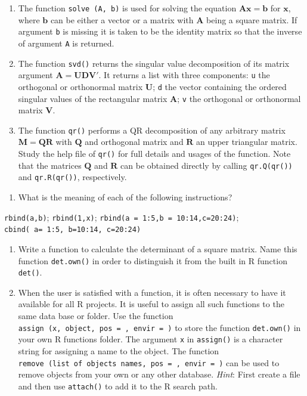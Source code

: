 \documentclass[
]{book}
\providecommand{\tightlist}{%
  \setlength{\itemsep}{0pt}\setlength{\parskip}{0pt}}
\begin{document}
\begin{enumerate}
\item
  The function \texttt{solve\ (A,\ b)} is used for solving the equation \(\mathbf{Ax=b}\) for \(\mathbf{x}\), where \(\mathbf{b}\) can be either a vector or a matrix with \(\mathbf{A}\) being a square matrix. If argument \texttt{b} is missing it is taken to be the identity matrix so that the inverse of argument \texttt{A} is returned.
\item
  The function \texttt{svd()} returns the singular value decomposition of its matrix argument \(\mathbf{A=UDV}'\). It returns a list with three components: \texttt{u} the orthogonal or orthonormal matrix \(\mathbf{U}\); \texttt{d} the vector containing the ordered singular values of the rectangular matrix \(\mathbf{A}\); \texttt{v} the orthogonal or orthonormal matrix \(\mathbf{V}\).
\item
  The function \texttt{qr()} performs a QR decomposition of any arbitrary matrix \(\mathbf{M=QR}\) with \(\mathbf{Q}\) and orthogonal matrix and \(\mathbf{R}\) an upper triangular matrix. Study the help file of \texttt{qr()} for full details and usages of the function. Note that the matrices \(\mathbf{Q}\) and \(\mathbf{R}\) can be obtained directly by calling \texttt{qr.Q(qr())} and \texttt{qr.R(qr())}, respectively.
\end{enumerate}

\begin{enumerate}
\def\labelenumi{(\alph{enumi})}
\setcounter{enumi}{11}
\tightlist
\item
  What is the meaning of each of the following instructions?
\end{enumerate}

\texttt{rbind(a,b)}; \texttt{rbind(1,x)}; \texttt{rbind(a\ =\ 1:5,b\ =\ 10:14,c=20:24)}; \texttt{cbind(\ a=\ 1:5,\ b=10:14,\ c=20:24)}

\begin{enumerate}
\def\labelenumi{(\alph{enumi})}
\setcounter{enumi}{12}
\item
  Write a function to calculate the determinant of a square matrix. Name this function \texttt{det.own()} in order to distinguish it from the built in R function \texttt{det()}.
\item
  When the user is satisfied with a function, it is often necessary to have it available for all R projects. It is useful to assign all such functions to the same data base or folder. Use the function \texttt{assign\ (x,\ object,\ pos\ =\ ,\ envir\ =\ )} to store the function \texttt{det.own()} in your own R functions folder. The argument \texttt{x} in \texttt{assign()} is a character string for assigning a name to the object. The function \texttt{remove\ (list\ of\ objects\ names,\ pos\ =\ ,\ envir\ =\ )} can be used to remove objects from your own or any other database. \emph{Hint}: First create a file and then use \texttt{attach()} to add it to the R search path.
\end{enumerate}
\end{document}
